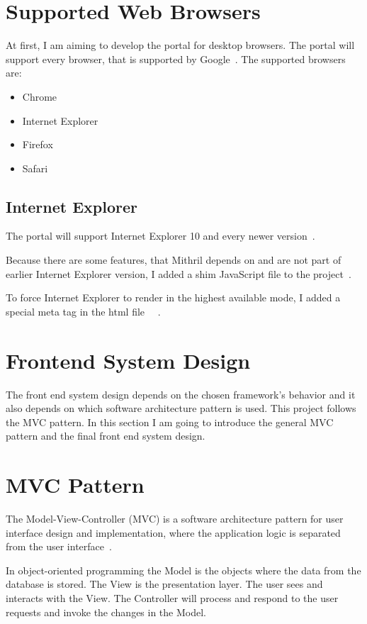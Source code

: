 \section{Supported Web Browsers}
At first, I am aiming to develop the portal for desktop browsers. The portal will support every browser, that is supported by Google~\cite{google-support}.
The supported browsers are:
\begin{itemize}
	\item Chrome
	\item Internet Explorer
	\item Firefox
	\item Safari
\end{itemize}

\subsection{Internet Explorer}
The portal will support Internet Explorer 10 and every newer version~\cite{google-support-blog}.

Because there are some features, that Mithril depends on and are not part of earlier Internet Explorer version, I added a shim JavaScript file to the project~\cite{Mithril-tools}. 

To force Internet Explorer to render in the highest available mode, I added a special meta tag in the html file~\cite{IE10-microsoft}~\cite{IE10-html5-boiler} .

\section{Frontend System Design}
\label{frontend-system-design}
The front end system design depends on the chosen framework's behavior and it also depends on which software architecture pattern is used. This project follows the MVC pattern. In this section I am going to introduce the general MVC pattern and the final front end system design. 

\section{MVC Pattern}
\label{mvc}

The Model-View-Controller (MVC) is a software architecture pattern for user interface design and implementation, where the application logic is separated from the user interface~\cite{szofttech}.

In object-oriented programming the Model is the objects where the data from the database is stored. The View is the presentation layer. The user sees and interacts with the View. The Controller will process and respond to the user requests and invoke the changes in the Model. 


